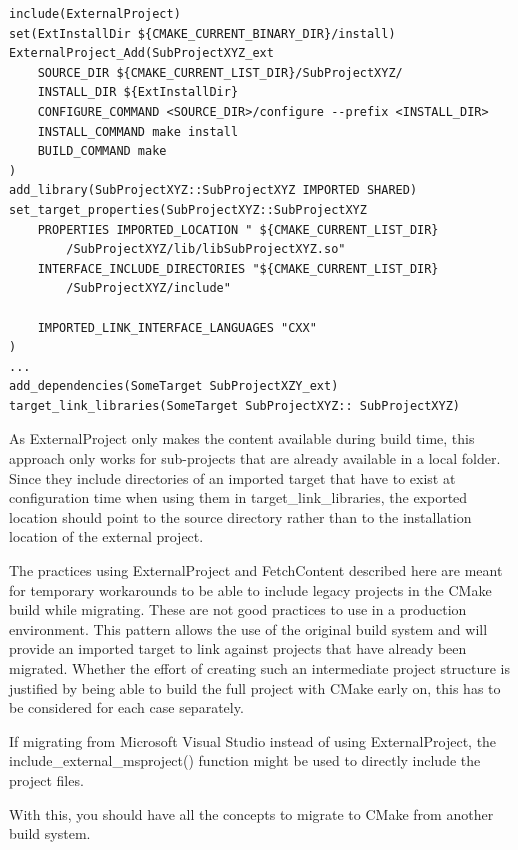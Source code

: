 \begin{lstlisting}[style=styleCMake]
include(ExternalProject)
set(ExtInstallDir ${CMAKE_CURRENT_BINARY_DIR}/install)
ExternalProject_Add(SubProjectXYZ_ext
	SOURCE_DIR ${CMAKE_CURRENT_LIST_DIR}/SubProjectXYZ/
	INSTALL_DIR ${ExtInstallDir}
	CONFIGURE_COMMAND <SOURCE_DIR>/configure --prefix <INSTALL_DIR>
	INSTALL_COMMAND make install
	BUILD_COMMAND make
)
add_library(SubProjectXYZ::SubProjectXYZ IMPORTED SHARED)
set_target_properties(SubProjectXYZ::SubProjectXYZ
	PROPERTIES IMPORTED_LOCATION " ${CMAKE_CURRENT_LIST_DIR}
		/SubProjectXYZ/lib/libSubProjectXYZ.so"
	INTERFACE_INCLUDE_DIRECTORIES "${CMAKE_CURRENT_LIST_DIR}
		/SubProjectXYZ/include"
	
	IMPORTED_LINK_INTERFACE_LANGUAGES "CXX"
)
...
add_dependencies(SomeTarget SubProjectXZY_ext)
target_link_libraries(SomeTarget SubProjectXYZ:: SubProjectXYZ)
\end{lstlisting}

As ExternalProject only makes the content available during build time, this approach only works for sub-projects that are already available in a local folder. Since they include directories of an imported target that have to exist at configuration time when using them in target\_link\_libraries, the exported location should point to the source directory rather than to the installation location of the external project.

\begin{tcolorbox}[colback=blue!5!white,colframe=blue!75!black,title=These Practices Are for Temporary Workarounds]
The practices using ExternalProject and FetchContent described here are meant for temporary workarounds to be able to include legacy projects in the CMake build while migrating. These are not good practices to use in a production environment. This pattern allows the use of the original build system and will provide an imported target to link against projects that have already been migrated. Whether the effort of creating such an intermediate project structure is justified by being able to build the full project with CMake early on, this has to be considered for each case separately.

If migrating from Microsoft Visual Studio instead of using ExternalProject, the include\_external\_msproject() function might be used to directly include the project files.
\end{tcolorbox}

With this, you should have all the concepts to migrate to CMake from another build system.


























